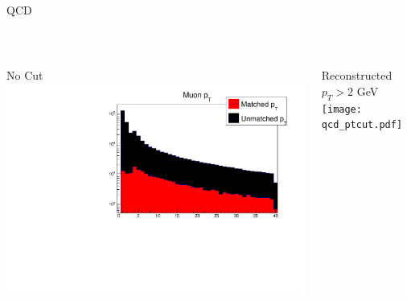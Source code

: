\documentclass[10pt,handout]{beamer}
\begin{document}

\begin{frame}{ QCD } 

\quad \quad \\
\begin{columns}
\begin{column}{0.5\textwidth}
No Cut
\includegraphics[scale=.3]{qcd_pt.pdf}

\end{column}
\begin{column}{0.5\textwidth}
Reconstructed $p_T > 2 $ GeV
\texttt{[image: qcd\_ptcut.pdf]}
\end{column}
\end{columns}
\end{frame}
\end{document}
